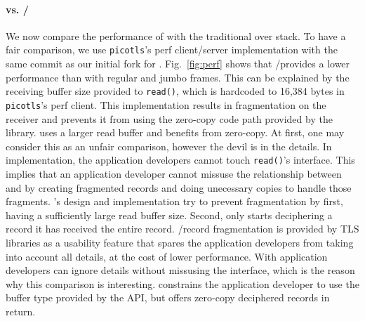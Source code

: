 \paragraph*{\tcpls vs. \tls/\tcp} We now compare the performance of \tcpls with
the traditional \tls over \tcp stack. To have a fair comparison, we use
\texttt{picotls}'s perf client/server
implementation with the same commit as our initial fork for \tcpls.
Fig.~\ref{fig:perf} shows that \tls/\tcp provides a lower performance than
\tcpls with regular and jumbo frames. This can be explained by the receiving
buffer size provided to \texttt{read()}, which is hardcoded to 16,384 bytes
in \texttt{picotls}'s perf client. This implementation results in fragmentation on the
receiver and prevents it from using the zero-copy code path provided by the
library. \tcpls uses a larger read buffer and benefits from zero-copy. At first,
one may consider this as an unfair comparison, however the devil is in the
details. In \tcpls implementation, the application developers cannot touch
\texttt{read()}'s interface. This implies that an application developer cannot
missuse the relationship between \tls and \tcp by creating fragmented records
and doing unecessary copies to handle those fragments. \tcpls's design and
implementation try to prevent fragmentation by first, having a sufficiently
large read buffer size. Second, \tcpls only starts deciphering a record it has
received the entire record. \tls/\tcp record fragmentation is provided by TLS
libraries as a usability feature that spares the application developers from
taking into account all \tls details, at the cost of lower performance.  With
\tcpls application developers can ignore \tls details without missusing the
interface, which is the reason why this comparison is interesting.\tcpls
constrains the application developer to use the buffer type provided by the API,
but offers zero-copy deciphered records in return.


